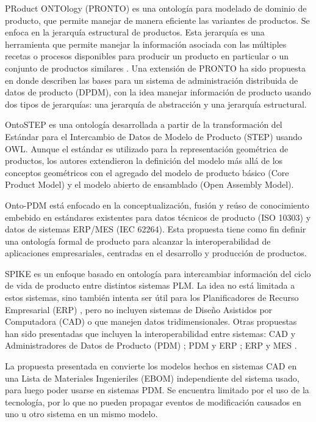 \documentclass[journal]{IEEEtran}
\begin{document}
PRoduct ONTOlogy (PRONTO) es una ontolog\'ia para modelado de dominio de producto, que permite manejar de manera eficiente las variantes de productos. Se enfoca en la jerarqu\'ia estructural de productos. Esta jerarqu\'ia es una herramienta que permite manejar la informaci\'on asociada con las m\'ultiples recetas o procesos disponibles para producir un producto en particular o un conjunto de productos similares \cite{Vegetti2005}. Una extensi\'on de PRONTO ha sido propuesta en \cite{Gimenez2006b} donde describen las bases para un sistema de administraci\'on distribuida de datos de producto (DPDM), con la idea manejar informaci\'on de producto usando dos tipos de jerarqu\'ias: una jerarqu\'ia de abstracci\'on y una jerarqu\'ia estructural. 

OntoSTEP \cite{ISOPrinciples} es una ontolog\'ia desarrollada a partir de la transformaci\'on del Est\'andar para el Intercambio de Datos de Modelo de Producto (STEP) usando OWL. Aunque el est\'andar es utilizado para la representaci\'on geom\'etrica de productos, los autores extendieron la definici\'on del modelo m\'as all\'a de los conceptos geom\'etricos con el agregado del modelo de producto b\'asico (Core Product Model) y el modelo abierto de ensamblado (Open Assembly Model). 

Onto-PDM \cite{Panetto2012} est\'a enfocado en la conceptualizaci\'on, fusi\'on y re\'uso de conocimiento embebido en est\'andares existentes para datos t\'ecnicos de producto (ISO 10303) y datos de sistemas ERP/MES (IEC 62264). Esta propuesta tiene como fin definir una ontolog\'ia formal de producto para alcanzar la interoperabilidad de aplicaciones empresariales, centradas en el desarrollo y producci\'on de productos.

SPIKE es un enfoque basado en ontolog\'ia para intercambiar informaci\'on del ciclo de vida de producto entre distintos sistemas PLM. La idea no est\'a limitada a estos sistemas, sino tambi\'en intenta ser \'util para los Planificadores de Recurso Empresarial (ERP) \cite{Bruno2016}, pero no incluyen sistemas de Dise\~no Asistidos por Computadora (CAD) o que manejen datos tridimensionales. Otras propuestas han sido presentadas que incluyen la interoperabilidad entre sistemas: CAD y Administradores de Datos de Producto (PDM) \cite{Paviot2011b}; PDM y ERP \cite{Paviot2011h}; ERP y MES \cite{Tursi2009}.

La propuesta presentada en \cite{Paviot2011b} convierte los modelos hechos en sistemas CAD en una Lista de Materiales Ingenieriles (EBOM) independiente del sistema usado, para luego poder usarse en sistemas PDM. Se encuentra limitado por el uso de la tecnolog\'ia, por lo que no pueden propagar eventos de modificaci\'on causados en uno u otro sistema en un mismo modelo. 
\end{document}
